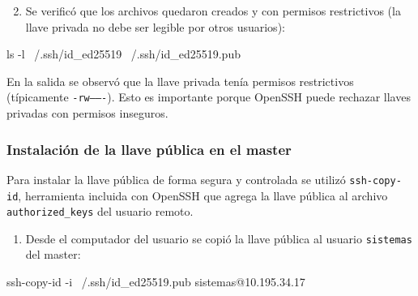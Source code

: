 
\begin{enumerate}
  \setcounter{enumi}{1}
  \item Se verificó que los archivos quedaron creados y con permisos restrictivos (la llave privada no debe ser legible por otros usuarios):
\end{enumerate}

\begin{terminalblock}
ls -l ~/.ssh/id_ed25519 ~/.ssh/id_ed25519.pub
\end{terminalblock}

En la salida se observó que la llave privada tenía permisos restrictivos (típicamente \texttt{-rw-------}). Esto es importante porque OpenSSH puede rechazar llaves privadas con permisos inseguros. \cite{redhat_key_based_auth_blog}


\subsubsection*{Instalación de la llave pública en el master}
Para instalar la llave pública de forma segura y controlada se utilizó \texttt{ssh-copy-id}, herramienta incluida con OpenSSH que agrega la llave pública al archivo \texttt{authorized\_keys} del usuario remoto. \cite{man_ssh_copy_id}

\begin{enumerate}
  \item Desde el computador del usuario se copió la llave pública al usuario \texttt{sistemas} del master:
\end{enumerate}

\begin{terminalblock}
ssh-copy-id -i ~/.ssh/id_ed25519.pub sistemas@10.195.34.17
\end{terminalblock}

